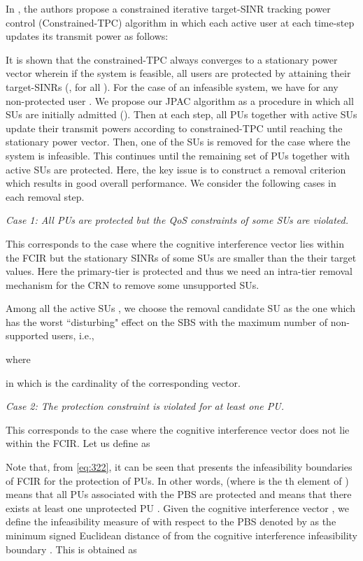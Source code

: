 \documentclass[journal,twoside]{IEEEtran}
\begin{document}
	In \cite{constrained_TPC}, the authors propose a constrained iterative target-SINR tracking power control (Constrained-TPC) algorithm in which each active user  at each time-step  updates its transmit power  as follows:
	
	It is shown that the constrained-TPC always converges to a stationary power vector  wherein if the system is feasible, all users are protected by attaining their target-SINRs (, for all ). For the case of an infeasible system, we have  for any non-protected user . We propose our JPAC algorithm as a procedure in which all SUs are initially admitted (). Then at each step, all PUs together with active SUs update their transmit powers according to constrained-TPC  until reaching the stationary power vector. Then, one of the SUs is removed for the case where the system is infeasible. This continues until the remaining set of PUs together with active SUs are protected. Here, the key issue is to construct a	removal criterion which results in good overall performance. We	consider the following cases in each removal step.
	
	\textit{Case 1: All PUs are protected but the QoS constraints of some SUs are violated.}


	This corresponds to the case where the cognitive interference vector  lies within the FCIR but the stationary SINRs of some SUs are smaller than the their target values. Here the primary-tier is protected and thus we need an intra-tier removal mechanism for the CRN to remove some unsupported SUs.


Among all the active SUs , we choose the removal candidate SU  as the one which has the worst ``disturbing" effect on the SBS  with the maximum number of non-supported users, i.e.,
	
	where 
	
	in which  is the cardinality of the corresponding vector.
	
	\textit{Case 2: The protection constraint is violated for at least one PU.}
	
	This corresponds to the case where the cognitive interference vector  does not lie within the FCIR. Let us define  as
	
	Note that, from \eqref{eq:322}, it can be seen that  presents the infeasibility boundaries of FCIR for the protection of PUs. In other words,  (where  is the th element of ) means that all PUs associated with the PBS  are protected and  means that there exists at least one unprotected PU .
	Given the cognitive interference vector , we define the infeasibility measure of  with respect to the PBS  denoted by  as the minimum signed Euclidean distance of  from the cognitive interference infeasibility boundary . This is obtained as
	
\end{document}
